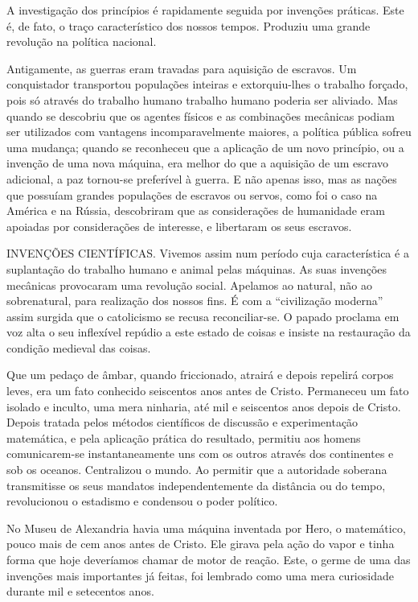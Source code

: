 \documentclass[11pt,a5paper,twoside,openany]{book}
\begin{document}
A investigação dos princípios é rapidamente seguida por invenções práticas. Este é, de fato, o traço característico dos nossos tempos. Produziu uma grande revolução na política nacional.

Antigamente, as guerras eram travadas para aquisição de escravos. Um conquistador transportou populações inteiras e extorquiu-lhes o trabalho forçado, pois só através do trabalho humano trabalho humano poderia ser aliviado. Mas quando se descobriu que os agentes físicos e as combinações mecânicas podiam ser utilizados com vantagens incomparavelmente maiores, a política pública sofreu uma mudança; quando se reconheceu que a aplicação de um novo princípio, ou a invenção de uma nova máquina, era melhor do que a aquisição de um escravo adicional, a paz tornou-se preferível à guerra. E não apenas isso, mas as nações que possuíam grandes populações de escravos ou servos, como foi o caso na América e na Rússia, descobriram que as considerações de humanidade eram apoiadas por considerações de interesse, e libertaram os seus escravos.

INVENÇÕES CIENTÍFICAS. Vivemos assim num período cuja característica é a suplantação do trabalho humano e animal pelas máquinas. As suas invenções mecânicas provocaram uma revolução social. Apelamos ao natural, não ao sobrenatural, para realização dos nossos fins. É com a “civilização moderna” assim surgida que o catolicismo se recusa reconciliar-se. O papado proclama em voz alta o seu inflexível repúdio a este estado de coisas e insiste na restauração da condição medieval das coisas.

Que um pedaço de âmbar, quando friccionado, atrairá e depois repelirá corpos leves, era um fato conhecido seiscentos anos antes de Cristo. Permaneceu um fato isolado e inculto, uma mera ninharia, até mil e seiscentos anos depois de Cristo. Depois tratada pelos métodos científicos de discussão e experimentação matemática, e pela aplicação prática do resultado, permitiu aos homens comunicarem-se instantaneamente uns com os outros através dos continentes e sob os oceanos. Centralizou o mundo. Ao permitir que a autoridade soberana transmitisse os seus mandatos independentemente da distância ou do tempo, revolucionou o estadismo e condensou o poder político.

No Museu de Alexandria havia uma máquina inventada por Hero, o matemático, pouco mais de cem anos antes de Cristo. Ele girava pela ação do vapor e tinha forma que hoje deveríamos chamar de motor de reação. Este, o germe de uma das invenções mais importantes já feitas, foi lembrado como uma mera curiosidade durante mil e setecentos anos.
\end{document}
